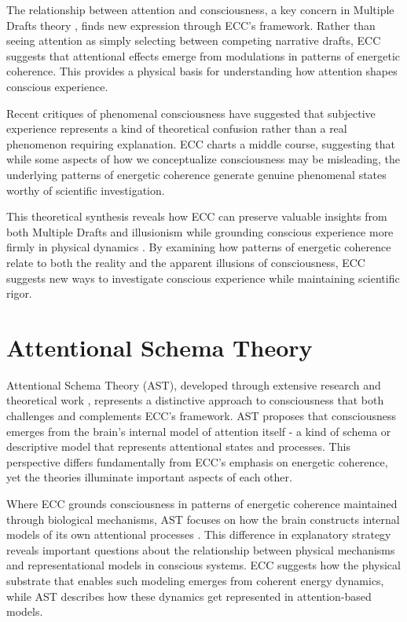 \begin{refsection}
The relationship between attention and consciousness, a key concern in Multiple Drafts theory \cite{VanGulick2018}, finds new expression through ECC's framework. Rather than seeing attention as simply selecting between competing narrative drafts, ECC suggests that attentional effects emerge from modulations in patterns of energetic coherence. This provides a physical basis for understanding how attention shapes conscious experience.

Recent critiques of phenomenal consciousness \cite{Frankish2016} have suggested that subjective experience represents a kind of theoretical confusion rather than a real phenomenon requiring explanation. ECC charts a middle course, suggesting that while some aspects of how we conceptualize consciousness may be misleading, the underlying patterns of energetic coherence generate genuine phenomenal states worthy of scientific investigation.

This theoretical synthesis reveals how ECC can preserve valuable insights from both Multiple Drafts and illusionism while grounding conscious experience more firmly in physical dynamics \cite{Dennett1991}. By examining how patterns of energetic coherence relate to both the reality and the apparent illusions of consciousness, ECC suggests new ways to investigate conscious experience while maintaining scientific rigor.

\section{Attentional Schema Theory}

Attentional Schema Theory (AST), developed through extensive research and theoretical work \cite{Graziano2013, Graziano2019}, represents a distinctive approach to consciousness that both challenges and complements ECC's framework. AST proposes that consciousness emerges from the brain's internal model of attention itself - a kind of schema or descriptive model that represents attentional states and processes. This perspective differs fundamentally from ECC's emphasis on energetic coherence, yet the theories illuminate important aspects of each other.

Where ECC grounds consciousness in patterns of energetic coherence maintained through biological mechanisms, AST focuses on how the brain constructs internal models of its own attentional processes \cite{Graziano2011}. This difference in explanatory strategy reveals important questions about the relationship between physical mechanisms and representational models in conscious systems. ECC suggests how the physical substrate that enables such modeling emerges from coherent energy dynamics, while AST describes how these dynamics get represented in attention-based models.


\end{refsection}
